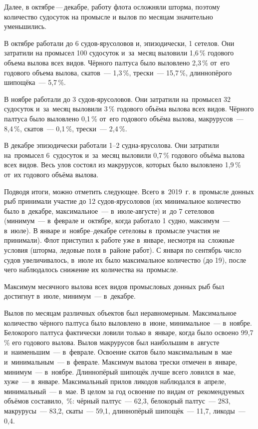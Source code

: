 Далее, в октябре\,---\,декабре, работу флота осложняли шторма, поэтому количество судосуток на промысле и вылов по месяцам значительно уменьшились.

В октябре работали до 6 судов-ярусоловов и, эпизодически, 1 сетелов. Они затратили на промысел 100 судосуток и~за~месяц выловили 1,6\,\% годового объема вылова всех видов. Чёрного палтуса было выловлено 2,3\,\% от~его годового объема вылова, скатов~--- 1,3\,\%, трески~--- 15,7\,\%, длиннопёрого шипощёка~--- 5,7\,\%.

В ноябре работали до 3 судов-ярусоловов. Они затратили на~промысел 32 судосуток и~за~месяц выловили 3\,\% годового объёма вылова всех видов. Чёрного палтуса было выловлено 0,1\,\% от~его годового объёма вылова, макрурусов~--- 8,4\,\%, скатов~--- 0,1\,\%, трески~--- 2,4\,\%.

В декабре эпизодически работали 1--2 судна-ярусолова. Они затратили на~промысел 6~судосуток и~за~месяц выловили 0,7\,\% годового объёма вылова всех видов. Весь улов состоял из макрурусов, которых было выловлено 1,9\,\% от~их годового объёма вылова.

Подводя итоги, можно отметить следующее. Всего в~2019~г. в~промысле донных рыб принимали участие до 12 судов-ярусоловов (их минимальное количество было в~декабре, максимальное~--- в~июле-августе) и~до 7 сетеловов (минимум~--- в~феврале и~октябре, когда работало 1 судно, максимум~--- в~июле). В январе и~ноябре--декабре сетеловы в~промысле участия не принимали). Флот приступил к работе уже в~январе, несмотря на~сложные условия (шторма, ледовые поля в~районе работ). С января по сентябрь число судов увеличивалось, в~июле их было максимальное количество (до 19), после чего наблюдалось снижение их количества на~промысле.

Максимум месячного вылова всех видов промысловых донных рыб был достигнут в~июле, минимум~--- в~декабре.

Вылов по месяцам различных объектов был неравномерным. Максимальное количество чёрного палтуса было выловлено в~июне, минимальное~--- в~ноябре. Белокорого палтуса фактически ловили только в~январе, когда было освоено 99,7\,\% его годового вылова. Вылов макрурусов был наибольшим в~августе и~наименьшим~--- в~феврале. Освоение скатов было максимальным в~мае и~минимальным~--- в~феврале. Максимум вылова трески отмечен в~январе, минимум~--- в~ноябре. Длиннопёрый шипощёк лучше всего ловился в~мае, хуже~--- в~январе. Максимальный прилов ликодов наблюдался в~апреле, минимальный~--- в~мае.
\clearpage
В целом за год освоение по видам от~рекомендуемых объёмов составило,~\%: чёрный палтус~--- 62,3, белокорый палтус~--- 283, макрурусы~--- 83,2, скаты~--- 59,1, длиннопёрый шипощёк~--- 11,7, ликоды~--- 0,4.

